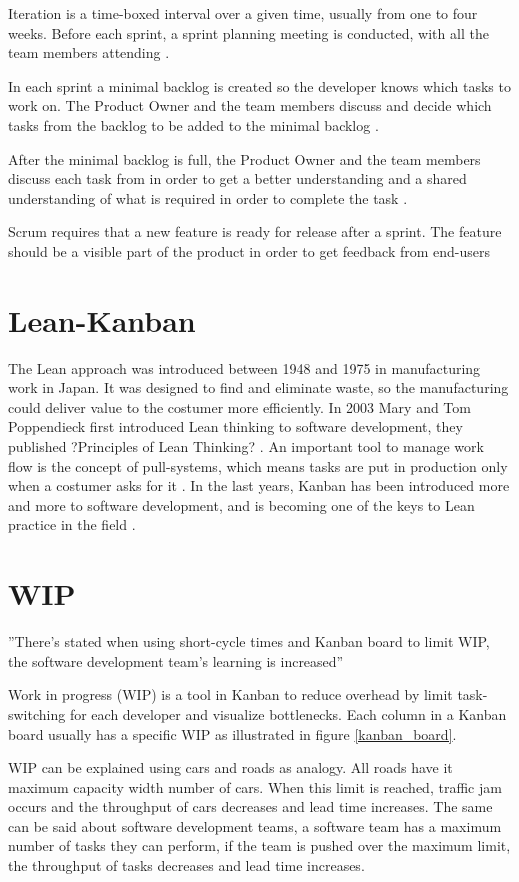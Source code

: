 \documentclass[UKenglish]{ifimaster}  %
\begin{document}
Iteration is a time-boxed interval over a given time, usually from one to four weeks. Before each sprint, a sprint planning meeting is conducted, with all the team members attending  \parencite{Scrum}.

In each sprint a minimal backlog is created so the developer knows which tasks to work on. The Product Owner and the team members discuss and decide which tasks from the backlog to be added to the minimal backlog  \parencite{Scrum}.

After the minimal backlog is full, the Product Owner and the team members discuss each task from in order to get a better understanding and a shared understanding of what is required in order to complete the task  \parencite{Scrum}.

Scrum requires that a new feature is ready for release after a sprint. The feature should be a visible part of the product in order to get feedback from end-users  \parencite{Scrum}

\section {Lean-Kanban}
The Lean approach was introduced between 1948 and 1975 in manufacturing work in Japan. It was designed to find and eliminate waste, so the manufacturing could deliver value to the costumer more efficiently. In 2003 Mary and Tom Poppendieck first introduced Lean thinking to software development, they published ?Principles of Lean Thinking? \parencite{Lean:2003}. An important tool to manage work flow is the concept of pull-systems, which means tasks are put in production only when a costumer asks for it \parencite{Lean:2009}.
In the last years, Kanban has been introduced more and more to software development, and is becoming one of the keys to Lean practice in the field \parencite{DavidAnderson}. 

\section{WIP}
''There's stated when using short-cycle times and Kanban board to limit WIP, the software development team's learning is increased'' \parencite{Joyce}

Work in progress (WIP) is a tool in Kanban to reduce overhead by limit task-switching for each developer and visualize bottlenecks. Each column in a Kanban board usually has a specific WIP as illustrated in figure \ref{kanban_board}.  

WIP can be explained using cars and roads as analogy. All roads have it maximum capacity width number of cars. When this limit is reached, traffic jam occurs and the throughput of cars decreases and lead time increases. The same can be said about software development teams, a software team has a maximum number of tasks they can perform, if the team is pushed over the maximum limit, the throughput of tasks decreases and lead time increases.
 
\end{document}
